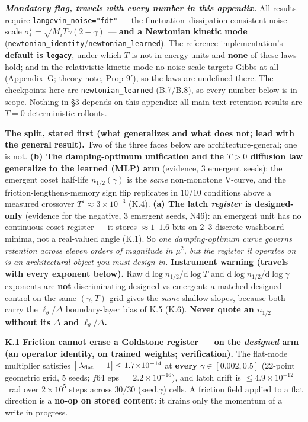 \documentclass[10pt]{article}
\begin{document}
\emph{\textbf{Mandatory flag, travels with every number in this appendix.}} All results require \texttt{langevin\_noise="fdt"} --- the fluctuation--dissipation-consistent noise scale $\sigma^\star_i=\sqrt{M_iT\gamma(2-\gamma)}$ --- \textbf{and a Newtonian kinetic mode} (\texttt{newtonian\_identity}/\texttt{newtonian\_learned}). The reference implementation's \textbf{default is \texttt{legacy}}, under which $T$ is not in energy units and \textbf{none} of these laws hold; and in the relativistic kinetic mode no noise scale targets Gibbs at all (Appendix~G; theory note, Prop-9$'$), so the laws are undefined there. The checkpoints here are \texttt{newtonian\_learned} (B.7/B.8), so every number below is in scope. Nothing in \S3 depends on this appendix: all main-text retention results are $T=0$ deterministic rollouts.

\textbf{The split, stated first (what generalizes and what does not; lead with the general result).} Two of the three faces below are architecture-general; one is not. \textbf{(b) The damping-optimum unification and the $T>0$ diffusion law generalize to the learned (MLP) arm} (evidence, $3$ emergent seeds): the emergent coset half-life $n_{1/2}(\gamma)$ is the \emph{same} non-monotone V-curve, and the friction-lengthens-memory sign flip replicates in $10/10$ conditions above a measured crossover $T^\star\approx3{\times}10^{-3}$ (K.4). \textbf{(a) The latch \emph{register} is designed-only} (evidence for the negative, $3$ emergent seeds, N46): an emergent unit has no continuous coset register --- it stores $\approx1$--$1.6$ bits on $2$--$3$ discrete washboard minima, not a real-valued angle (K.1). So \emph{one damping-optimum curve governs retention across eleven orders of magnitude in $\mu^2$, but the register it operates on is an architectural object you must design in.} \textbf{Instrument warning (travels with every exponent below).} Raw $\mathrm{d}\log n_{1/2}/\mathrm{d}\log T$ and $\mathrm{d}\log n_{1/2}/\mathrm{d}\log\gamma$ exponents are \textbf{not} discriminating designed-vs-emergent: a matched designed control on the same $(\gamma,T)$ grid gives the \emph{same} shallow slopes, because both carry the $\ell_\theta/\Delta$ boundary-layer bias of K.5 (K.6). \textbf{Never quote an $n_{1/2}$ without its $\Delta$ and $\ell_\theta/\Delta$.}

\textbf{K.1 Friction cannot erase a Goldstone register --- on the \emph{designed} arm (an operator identity, on trained weights; verification).} The flat-mode multiplier satisfies $\big||\lambda_{\rm flat}|-1\big|\le1.7{\times}10^{-14}$ at \textbf{every} $\gamma\in[0.002,0.5]$ ($22$-point geometric grid, $5$ seeds; $f64$ eps $=2.2{\times}10^{-16}$), and latch drift is $\le4.9{\times}10^{-12}$~rad over $2{\times}10^5$ steps across $30/30$ (seed,$\gamma$) cells. A friction field applied to a flat direction is a \textbf{no-op on stored content}: it drains only the momentum of a write in progress.
\end{document}

